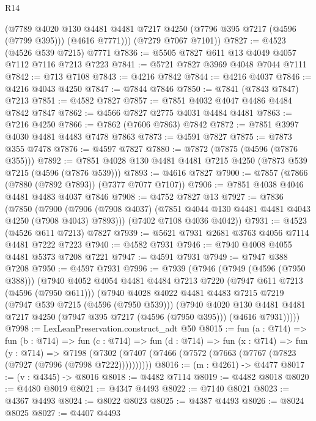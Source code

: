 \begin{lexlean}{R14}
\begin{coremodule}
        (@7789
          @4020
          @130
          @4481
          @4481
          @7217
          @4250
          (@7796 @395 @7217 (@4596 (@7799 @395)))
          (@4616 @7771)))
      (@7279 @7067 @7101))
@7827 := @4523 (@4526 @539 @7215) @7771
@7836 := @5505 @7827 @611 @13 @4049 @4057 @7112 @7116 @7213 @7223
@7841 := @5721 @7827 @3969 @4048 @7044 @7111
@7842 := @713 @7108
@7843 := @4216 @7842
@7844 := @4216 @4037
@7846 := @4216 @4043 @4250
@7847 := @7844 @7846
@7850 := @7841 (@7843 @7847) @7213
@7851 := @4582 @7827
@7857 := @7851 @4032 @4047 @4486 @4484 @7842 @7847
@7862 := @4566 @7827 @2775 @4031 @4484 @4481
@7863 := @7216 @4250
@7866 := @7862 (@7606 @7863) @7842
@7872 := @7851 @3997 @4030 @4481 @4483 @7478 @7863
@7873 := @4591 @7827
@7875 := @7873 @355 @7478
@7876 := @4597 @7827
@7880 := @7872 (@7875 (@4596 (@7876 @355)))
@7892 := @7851 @4028 @130 @4481 @4481 @7215 @4250 (@7873 @539 @7215 (@4596 (@7876 @539)))
@7893 := @4616 @7827
@7900 := @7857 (@7866 (@7880 (@7892 @7893)) (@7377 @7077 @7107))
@7906 := @7851 @4038 @4046 @4481 @4483 @4037 @7846
@7908 := @4752 @7827 @13
@7927 := @7836
    (@7850
      (@7900 (@7906 (@7908 @4037) (@7851 @4044 @130 @4481 @4481 @4043 @4250 (@7908 @4043) @7893)))
      (@7402 @7108 @4036 @4042))
@7931 := @4523 (@4526 @611 @7213) @7827
@7939 := @5621 @7931 @2681 @3763 @4056 @7114 @4481 @7222 @7223
@7940 := @4582 @7931
@7946 := @7940 @4008 @4055 @4481 @5373 @7208 @7221
@7947 := @4591 @7931
@7949 := @7947 @388 @7208
@7950 := @4597 @7931
@7996 := @7939
    (@7946
      (@7949 (@4596 (@7950 @388)))
      (@7940
        @4052
        @4054
        @4481
        @4484
        @7213
        @7220
        (@7947 @611 @7213 (@4596 (@7950 @611)))
        (@7940
          @4028
          @4022
          @4481
          @4483
          @7215
          @7219
          (@7947 @539 @7215 (@4596 (@7950 @539)))
          (@7940
            @4020
            @130
            @4481
            @4481
            @7217
            @4250
            (@7947 @395 @7217 (@4596 (@7950 @395)))
            (@4616 @7931)))))
@7998 := LexLeanPreservation.construct_adt @50
@8015 := fun (a : @714) =>
  fun (b : @714) =>
  fun (c : @714) =>
  fun (d : @714) =>
  fun (x : @714) =>
  fun (y : @714) =>
  @7198 (@7302 (@7407 (@7466 (@7572 (@7663 (@7767 (@7823 (@7927 (@7996 (@7998 @7222))))))))))
@8016 := (m : @4261) -> @4477
@8017 := (v : @4345) -> @8016
@8018 := @4482 @7114
@8019 := @4482 @8018
@8020 := @4480 @8019
@8021 := @4347 @4493
@8022 := @7140 @8021
@8023 := @4367 @4493
@8024 := @8022 @8023
@8025 := @4387 @4493
@8026 := @8024 @8025
@8027 := @4407 @4493

\end{coremodule}
\end{lexlean}
